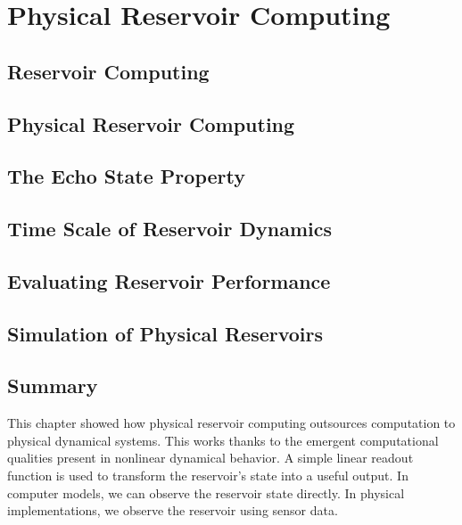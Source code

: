 
\chapter{Physical Reservoir Computing} \label{chapter:lit-prc}

\section{Reservoir Computing} \label{section:rc}
 

\section{Physical Reservoir Computing} \label{section:prc}
 

\section{The Echo State Property} \label{section:esp}



\section{Time Scale of Reservoir Dynamics} \label{section:rc-time-scales}
 

\section{Evaluating Reservoir Performance} \label{section:reservoir-eval}


\section{Simulation of Physical Reservoirs} \label{section:prc-simulation}


\section{Summary} \label{section:prc-summary}

This chapter showed how physical reservoir computing outsources computation to physical dynamical systems.
This works thanks to the emergent computational qualities present in nonlinear dynamical behavior.
A simple linear readout function is used to transform the reservoir's state into a useful output.
In computer models, we can observe the reservoir state directly.
In physical implementations, we observe the reservoir using sensor data.

